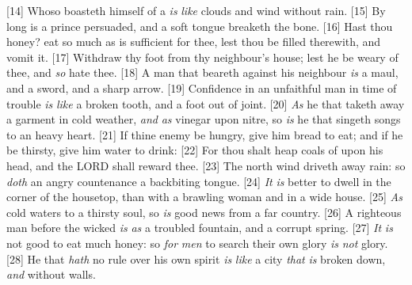 [14] \textcolor[cmyk]{0.99998,1,0,0}{Whoso boasteth himself of a  \emph{is} \emph{like} clouds and wind without rain.}
[15] \textcolor[cmyk]{0.99998,1,0,0}{By long  is a prince persuaded, and a soft tongue breaketh the bone.}
[16] \textcolor[cmyk]{0.99998,1,0,0}{Hast thou  honey? eat so much as is sufficient for thee, lest thou be filled therewith, and vomit it.}
[17] \textcolor[cmyk]{0.99998,1,0,0}{Withdraw thy foot from thy neighbour's house; lest he be weary of thee, and \emph{so} hate thee.}
[18] \textcolor[cmyk]{0.99998,1,0,0}{A man that beareth  against his neighbour \emph{is} a maul, and a sword, and a sharp arrow.}
[19] \textcolor[cmyk]{0.99998,1,0,0}{Confidence in an unfaithful man in time of trouble \emph{is} \emph{like} a broken tooth, and a foot out of joint.}
[20] \textcolor[cmyk]{0.99998,1,0,0}{\emph{As} he that taketh away a garment in cold weather, \emph{and} \emph{as} vinegar upon nitre, so \emph{is} he that singeth songs to an heavy heart.}
[21] \textcolor[cmyk]{0.99998,1,0,0}{If thine enemy be hungry, give him bread to eat; and if he be thirsty, give him water to drink:}
[22] \textcolor[cmyk]{0.99998,1,0,0}{For thou shalt heap coals of  upon his head, and the LORD shall reward thee.}
[23] \textcolor[cmyk]{0.99998,1,0,0}{The north wind driveth away rain: so \emph{doth} an angry countenance a backbiting tongue.}
[24] \textcolor[cmyk]{0.99998,1,0,0}{\emph{It} \emph{is} better to dwell in the corner of the housetop, than with a brawling woman and in a wide house.}
[25] \textcolor[cmyk]{0.99998,1,0,0}{\emph{As} cold waters to a thirsty soul, so \emph{is} good news from a far country.}
[26] \textcolor[cmyk]{0.99998,1,0,0}{A righteous man  before the wicked \emph{is} \emph{as} a troubled fountain, and a corrupt spring.}
[27] \textcolor[cmyk]{0.99998,1,0,0}{\emph{It} \emph{is} not good to eat much honey: so \emph{for} \emph{men} to search their own glory \emph{is} \emph{not} glory.}
[28] \textcolor[cmyk]{0.99998,1,0,0}{He that \emph{hath} no rule over his own spirit \emph{is} \emph{like} a city \emph{that} \emph{is} broken down, \emph{and} without walls.}


